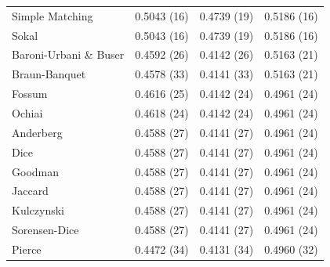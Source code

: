 \begin{table}[t]
{\begin{tabular}{lccc}
Simple Matching & 0.5043 (16) & 0.4739 (19) & 0.5186 (16) \\
Sokal & 0.5043 (16) & 0.4739 (19) & 0.5186 (16) \\
Baroni-Urbani \& Buser & 0.4592 (26) & 0.4142 (26) & 0.5163 (21) \\
Braun-Banquet & 0.4578 (33) & 0.4141 (33) & 0.5163 (21) \\
Fossum & 0.4616 (25) & 0.4142 (24) & 0.4961 (24) \\
Ochiai & 0.4618 (24) & 0.4142 (24) & 0.4961 (24) \\
Anderberg & 0.4588 (27) & 0.4141 (27) & 0.4961 (24) \\
Dice & 0.4588 (27) & 0.4141 (27) & 0.4961 (24) \\
Goodman & 0.4588 (27) & 0.4141 (27) & 0.4961 (24) \\
Jaccard & 0.4588 (27) & 0.4141 (27) & 0.4961 (24) \\
Kulczynski & 0.4588 (27) & 0.4141 (27) & 0.4961 (24) \\
Sorensen-Dice & 0.4588 (27) & 0.4141 (27) & 0.4961 (24) \\
Pierce & 0.4472 (34) & 0.4131 (34) & 0.4960 (32) \\
\bottomrule
\end{tabular}
}
\end{table}
